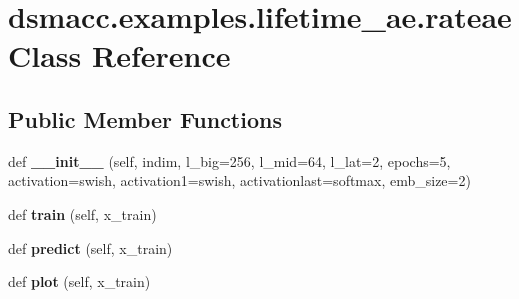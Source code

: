 \hypertarget{classdsmacc_1_1examples_1_1lifetime__ae_1_1rateae}{}\section{dsmacc.\+examples.\+lifetime\+\_\+ae.\+rateae Class Reference}
\label{classdsmacc_1_1examples_1_1lifetime__ae_1_1rateae}
\subsection*{Public Member Functions}
\begin{DoxyCompactItemize}
\item 
\mbox{\label{classdsmacc_1_1examples_1_1lifetime__ae_1_1rateae_a19dafe17eb452438699d9383a846bf03}} 
def {\bfseries \+\_\+\+\_\+init\+\_\+\+\_\+} (self, indim, l\+\_\+big=256, l\+\_\+mid=64, l\+\_\+lat=2, epochs=5, activation=\textquotesingle{}swish\textquotesingle{}, activation1=\textquotesingle{}swish\textquotesingle{}, activationlast=\textquotesingle{}softmax\textquotesingle{}, emb\+\_\+size=2)
\item 
\mbox{\label{classdsmacc_1_1examples_1_1lifetime__ae_1_1rateae_a56c8a81f9b302a51864656edf7f39874}} 
def {\bfseries train} (self, x\+\_\+train)
\item 
\mbox{\label{classdsmacc_1_1examples_1_1lifetime__ae_1_1rateae_a3e8209a216d02d08b117e15ef4ef37c9}} 
def {\bfseries predict} (self, x\+\_\+train)
\item 
\mbox{\label{classdsmacc_1_1examples_1_1lifetime__ae_1_1rateae_ad431b0f2debee84cbfe4d603bffd51b6}} 
def {\bfseries plot} (self, x\+\_\+train)
\end{DoxyCompactItemize}
